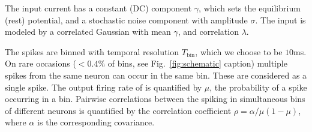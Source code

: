 \documentclass[%
 reprint,
 twocolumn,
 amsmath,amssymb,
 aps,
floatfix,
]{revtex4}
\begin{document}
The input current has a constant (DC) component $\gamma$, which sets the equilibrium (rest) potential, and a stochastic noise component with amplitude $\sigma$. The input is modeled by a correlated Gaussian with mean $\gamma$, and correlation $\lambda$. 

The spikes are binned with temporal resolution $T_\text{bin}$, which we choose to be $10$ms. On rare occasions ($<0.4\%$ of bins, see Fig.~\ref{fig:schematic} caption) multiple spikes from the same neuron can occur in the same bin. These are considered as a single spike. The output firing rate of is quantified by $\mu$, the probability of a spike occurring in a bin. Pairwise correlations between the spiking in simultaneous bins of different neurons is quantified by the correlation coefficient $\rho=\alpha/\mu(1-\mu)$, where $\alpha$ is the corresponding covariance.
\end{document}
